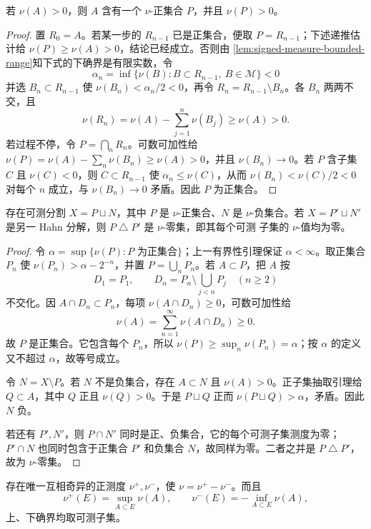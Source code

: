 \begin{lemma}[正子集抽取]\label{lem:hahn-positive-subset}
若 $\nu(A)>0$，则 $A$ 含有一个 $\nu$-正集合 $P$，并且 $\nu(P)>0$。
\end{lemma}

\begin{proof}
置 $R_0=A$。若某一步的 $R_{n-1}$ 已是正集合，便取 $P=R_{n-1}$；下述递推估计给
$\nu(P)\ge\nu(A)>0$，结论已经成立。否则由
\cref{lem:signed-measure-bounded-range}知下式的下确界是有限实数，令
\[
 \alpha_n=\inf\{\nu(B):B\subset R_{n-1},\ B\in\mathcal M\}<0
\]
并选 $B_n\subset R_{n-1}$ 使 $\nu(B_n)<\alpha_n/2<0$，再令
$R_n=R_{n-1}\setminus B_n$。各 $B_n$ 两两不交，且
\[
 \nu(R_n)=\nu(A)-\sum_{j=1}^n\nu(B_j)\ge\nu(A)>0.
\]
若过程不停，令 $P=\bigcap_nR_n$。可数可加性给
$\nu(P)=\nu(A)-\sum_n\nu(B_n)\ge\nu(A)>0$，并且
$\nu(B_n)\to0$。若 $P$ 含子集 $C$ 且 $\nu(C)<0$，则
$C\subset R_{n-1}$ 使 $\alpha_n\le\nu(C)$，从而
$\nu(B_n)<\nu(C)/2<0$ 对每个 $n$ 成立，与 $\nu(B_n)\to0$ 矛盾。因此 $P$ 为正集合。
\end{proof}

\begin{theorem}[Hahn 分解]\label{theorem:2-2-3-1}
存在可测分割 $X=P\sqcup N$，其中 $P$ 是 $\nu$-正集合、$N$ 是 $\nu$-负集合。若
$X=P'\sqcup N'$ 是另一 Hahn 分解，则 $P\mathbin\triangle P'$ 是 $\nu$-零集，即其每个可测
子集的 $\nu$-值均为零。
\end{theorem}

\begin{proof}
令
$\alpha=\sup\{\nu(P):P\text{ 为正集合}\}$；上一有界性引理保证 $\alpha<\infty$。取正集合
$P_n$ 使 $\nu(P_n)>\alpha-2^{-n}$，并置 $P=\bigcup_nP_n$。若 $A\subset P$，把
$A$ 按
\[
 D_1=P_1,\qquad D_n=P_n\setminus\bigcup_{j<n}P_j\quad(n\ge2)
\]
不交化。因 $A\cap D_n\subset P_n$，每项 $\nu(A\cap D_n)\ge0$，可数可加性给
\[
 \nu(A)=\sum_{n=1}^{\infty}\nu(A\cap D_n)\ge0.
\]
故
$P$ 是正集合。它包含每个 $P_n$，所以
$\nu(P)\ge\sup_n\nu(P_n)=\alpha$；按 $\alpha$ 的定义又不超过 $\alpha$，故等号成立。

令 $N=X\setminus P$。若 $N$ 不是负集合，存在 $A\subset N$ 且 $\nu(A)>0$。正子集抽取引理给
$Q\subset A$，其中 $Q$ 正且 $\nu(Q)>0$。于是 $P\sqcup Q$ 正而
$\nu(P\sqcup Q)>\alpha$，矛盾。因此 $N$ 负。

若还有 $P',N'$，则 $P\cap N'$ 同时是正、负集合，它的每个可测子集测度为零；
$P'\cap N$ 也同时包含于正集合 $P'$ 和负集合 $N$，故同样为零。二者之并是
$P\mathbin\triangle P'$，故为 $\nu$-零集。
\end{proof}

\begin{theorem}[Jordan 分解]\label{theorem:2-2-3-2}
存在唯一互相奇异的正测度 $\nu^+,\nu^-$，使
$\nu=\nu^+-\nu^-$。而且
\[
 \nu^+(E)=\sup_{A\subset E}\nu(A),\qquad
 \nu^-(E)=-\inf_{A\subset E}\nu(A),
 \label{eq:jordan-extrema}
\]
上、下确界均取可测子集。
\end{theorem}

